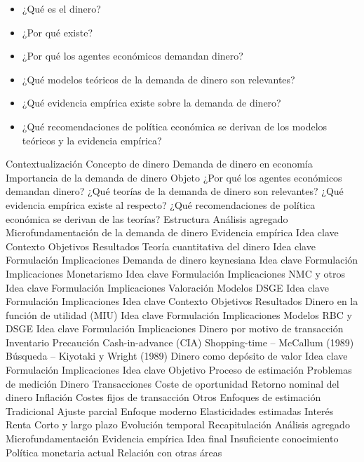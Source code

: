 \documentclass{nuevotema}
\begin{document}
\ideaclave

\begin{itemize}
	\item ¿Qué es el dinero?
	\item ¿Por qué existe?
	\item ¿Por qué los agentes económicos demandan dinero?
	\item ¿Qué modelos teóricos de la demanda de dinero son relevantes?
	\item ¿Qué evidencia empírica existe sobre la demanda de dinero?
	\item ¿Qué recomendaciones de política económica se derivan de los modelos teóricos y la evidencia empírica?
\end{itemize}

\esquemacorto

\begin{esquema}[enumerate]
	\1[] 
		\2 Contextualización
			\3 Concepto de dinero
			\3 Demanda de dinero en economía
			\3 Importancia de la demanda de dinero
		\2 Objeto
			\3 ¿Por qué los agentes económicos demandan dinero?
			\3 ¿Qué teorías de la demanda de dinero son relevantes?
			\3 ¿Qué evidencia empírica existe al respecto?
			\3 ¿Qué recomendaciones de política económica se derivan de las teorías?
		\2 Estructura
			\3 Análisis agregado
			\3 Microfundamentación de la demanda de dinero
			\3 Evidencia empírica
	\1 
		\2 Idea clave
			\3 Contexto
			\3 Objetivos
			\3 Resultados
		\2 Teoría cuantitativa del dinero
			\3 Idea clave
			\3 Formulación
			\3 Implicaciones
		\2 Demanda de dinero keynesiana
			\3 Idea clave
			\3 Formulación
			\3 Implicaciones
		\2 Monetarismo
			\3 Idea clave
			\3 Formulación
			\3 Implicaciones
		\2 NMC y otros
			\3 Idea clave
			\3 Formulación
			\3 Implicaciones
			\3 Valoración
		\2 Modelos DSGE
			\3 Idea clave
			\3 Formulación
			\3 Implicaciones
	\1 
		\2 Idea clave
			\3 Contexto
			\3 Objetivos
			\3 Resultados
		\2[I] Dinero en la función de utilidad (MIU)
			\3 Idea clave
			\3 Formulación
			\3 Implicaciones
		\2 Modelos RBC y DSGE
			\3 Idea clave
			\3 Formulación
			\3 Implicaciones
		\2[II] Dinero por motivo de transacción
			\3 Inventario
			\3 Precaución
			\3 Cash-in-advance (CIA)
			\3 Shopping-time -- McCallum (1989)
			\3 Búsqueda -- Kiyotaki y Wright (1989)
		\2[III] Dinero como depósito de valor
			\3 Idea clave
			\3 Formulación
			\3 Implicaciones
	\1 
		\2 Idea clave
			\3 Objetivo
			\3 Proceso de estimación
		\2 Problemas de medición
			\3 Dinero
			\3 Transacciones
			\3 Coste de oportunidad
			\3 Retorno nominal del dinero
			\3 Inflación
			\3 Costes fijos de transacción
			\3 Otros
		\2 Enfoques de estimación
			\3 Tradicional
			\3 Ajuste parcial
			\3 Enfoque moderno
		\2 Elasticidades estimadas
			\3 Interés
			\3 Renta
			\3 Corto y largo plazo
			\3 Evolución temporal
	\1[] 
		\2 Recapitulación
			\3 Análisis agregado
			\3 Microfundamentación
			\3 Evidencia empírica
		\2 Idea final
			\3 Insuficiente conocimiento
			\3 Política monetaria actual
			\3 Relación con otras áreas


\end{esquema}
\end{document}
